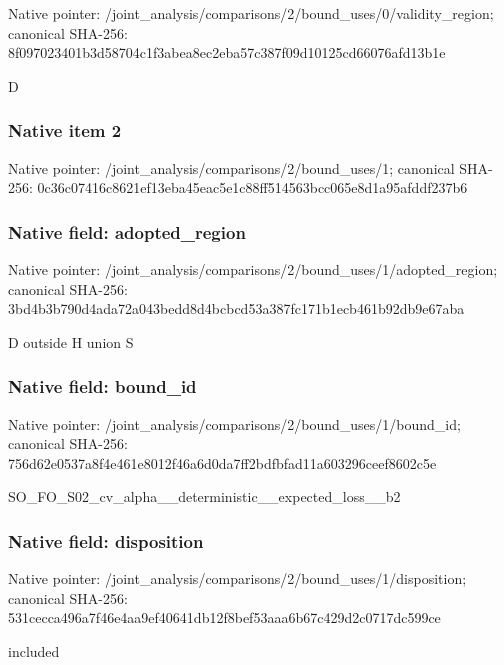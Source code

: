 \documentclass[10pt,a4paper]{article}
\begin{document}
Native pointer: /joint\_analysis/comparis\allowbreak{}ons/2/bound\_uses/0/valid\allowbreak{}ity\_region; canonical SHA-256: 8f097023401b3d58704c1f3a\allowbreak{}bea8ec2eba57c387f09d1012\allowbreak{}5cd66076afd13b1e


D


\subsubsection{Native item 2}


Native pointer: /joint\_analysis/comparis\allowbreak{}ons/2/bound\_uses/1; canonical SHA-256: 0c36c07416c8621ef13eba45\allowbreak{}eac5e1c88ff514563bcc065e\allowbreak{}8d1a95afddf237b6



\subsubsection{Native field: adopted\_region}


Native pointer: /joint\_analysis/comparis\allowbreak{}ons/2/bound\_uses/1/adopt\allowbreak{}ed\_region; canonical SHA-256: 3bd4b3b790d4ada72a043bed\allowbreak{}d8d4bcbcd53a387fc171b1ec\allowbreak{}b461b92db9e67aba


D outside H union S


\subsubsection{Native field: bound\_id}


Native pointer: /joint\_analysis/comparis\allowbreak{}ons/2/bound\_uses/1/bound\allowbreak{}\_id; canonical SHA-256: 756d62e0537a8f4e461e8012\allowbreak{}f46a6d0da7ff2bdfbfad11a6\allowbreak{}03296ceef8602c5e


SO\_FO\_S02\_cv\_alpha\_\_dete\allowbreak{}rministic\_\_expected\_loss\allowbreak{}\_\_b2


\subsubsection{Native field: disposition}


Native pointer: /joint\_analysis/comparis\allowbreak{}ons/2/bound\_uses/1/dispo\allowbreak{}sition; canonical SHA-256: 531cecca496a7f46e4aa9ef4\allowbreak{}0641db12f8bef53aaa6b67c4\allowbreak{}29d2c0717dc599ce


included
\end{document}
